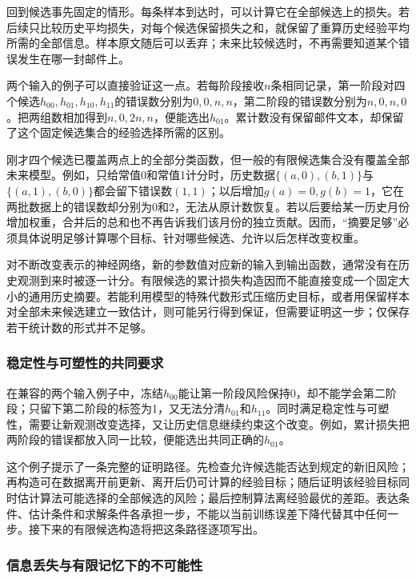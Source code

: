 回到候选事先固定的情形。每条样本到达时，可以计算它在全部候选上的损失。若后续只比较历史平均损失，对每个候选保留损失之和，就保留了重算历史经验平均所需的全部信息。样本原文随后可以丢弃；未来比较候选时，不再需要知道某个错误发生在哪一封邮件上。

两个输入的例子可以直接验证这一点。若每阶段接收$n$条相同记录，第一阶段对四个候选$h_{00},h_{01},h_{10},h_{11}$的错误数分别为$0,0,n,n$，第二阶段的错误数分别为$n,0,n,0$。把两组数相加得到$n,0,2n,n$，便能选出$h_{01}$。累计数没有保留邮件文本，却保留了这个固定候选集合的经验选择所需的区别。

刚才四个候选已覆盖两点上的全部分类函数，但一般的有限候选集合没有覆盖全部未来模型。例如，只给常值0和常值1计分时，历史数据$\{(a,0),(b,1)\}$与$\{(a,1),(b,0)\}$都会留下错误数$(1,1)$；以后增加$g(a)=0,g(b)=1$，它在两批数据上的错误数却分别为0和2，无法从原计数恢复。若以后要给某一历史月份增加权重，合并后的总和也不再告诉我们该月份的独立贡献。因而，“摘要足够”必须具体说明足够计算哪个目标、针对哪些候选、允许以后怎样改变权重。

对不断改变表示的神经网络，新的参数值对应新的输入到输出函数，通常没有在历史观测到来时被逐一计分。有限候选的累计损失构造因而不能直接变成一个固定大小的通用历史摘要。若能利用模型的特殊代数形式压缩历史目标，或者用保留样本对全部未来候选建立一致估计，则可能另行得到保证，但需要证明这一步；仅保存若干统计数的形式并不足够。

\subsubsection{稳定性与可塑性的共同要求}

在兼容的两个输入例子中，冻结$h_{00}$能让第一阶段风险保持0，却不能学会第二阶段；只留下第二阶段的标签为1，又无法分清$h_{01}$和$h_{11}$。同时满足稳定性与可塑性，需要让新观测改变选择，又让历史信息继续约束这个改变。例如，累计损失把两阶段的错误都放入同一比较，便能选出共同正确的$h_{01}$。

这个例子提示了一条完整的证明路径。先检查允许候选能否达到规定的新旧风险；再构造可在数据离开前更新、离开后仍可计算的经验目标；随后证明该经验目标同时估计算法可能选择的全部候选的风险；最后控制算法离经验最优的差距。表达条件、估计条件和求解条件各承担一步，不能以当前训练误差下降代替其中任何一步。接下来的有限候选构造将把这条路径逐项写出。

\subsubsection{信息丢失与有限记忆下的不可能性}

